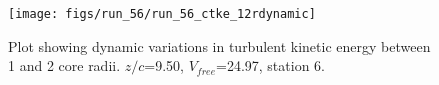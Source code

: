 \begin{figure}[H]
\centering
\texttt{[image: figs/run\_56/run\_56\_ctke\_12rdynamic]}
\caption{Plot showing dynamic variations in turbulent kinetic energy between 1 and 2 core radii. $z/c$=9.50, $V_{free}$=24.97, station 6.}
\label{fig:run_56_ctke_12rdynamic}
\end{figure}


